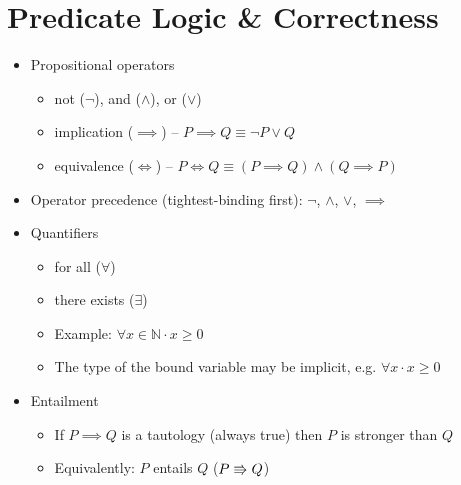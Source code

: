 \section{Predicate Logic \& Correctness}

\begin{itemize}
	
	\item Propositional operators
	
	\begin{itemize}
		
		\item not ($ \lnot $), and ($ \land $), or ($ \lor $)
		
		\item implication ($ \implies $) -- $ P \implies Q \equiv \lnot P \lor Q $
		
		\item equivalence ($ \iff $) -- $ P \iff Q \equiv (P \implies Q) \land (Q \implies P)$
		
	\end{itemize}
	
	\item Operator precedence (tightest-binding first): $ \lnot $, $ \land $, $ \lor $, $ \implies $
	
	\item Quantifiers
	
	\begin{itemize}
		
		\item for all ($ \forall $)
		
		\item there exists ($ \exists $)
		
		\item Example: $ \forall x \in \mathbb{N} \cdot x \ge 0 $
		
		\item The type of the bound variable may be implicit, e.g. $ \forall x \cdot x \ge 0 $
		
	\end{itemize}

	\item Entailment
	
	\begin{itemize}
		
		\item If $ P \implies Q $ is a tautology (always true) then $ P $ is stronger than $ Q $
		
		\item Equivalently: $ P $ entails $ Q $ ($ P \Rrightarrow Q $)
		

\end{itemize}
\end{itemize}
